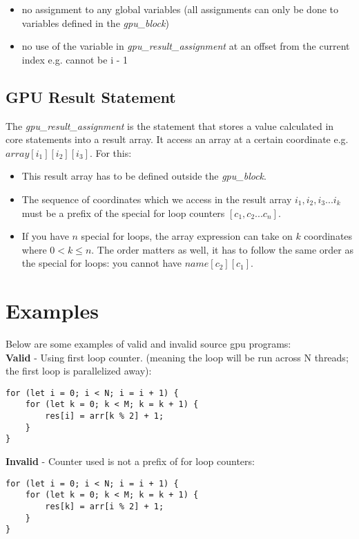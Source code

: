 \begin{itemize}
    \item{no assignment to any global variables (all assignments can only be done to variables defined in the \textit{gpu\_block}})
    \item{no use of the variable in \textit{gpu\_result\_assignment} at an offset from the current index e.g. cannot be i - 1}
\end{itemize}

\subsection*{GPU Result Statement}

The \textit{gpu\_result\_assignment} is the statement that stores a value calculated in core statements into a result array. 
It access an array at a certain coordinate e.g. ${array[{i_1}][{i_2}][{i_3}]}$. For this:

\begin{itemize}
    \item{This result array has to be defined outside the \textit{gpu\_block}.}
    \item{The sequence of coordinates which we access in the result array ${{i_1}, {i_2}, {i_3} ... i_{k}}$ must be a 
        prefix of the special for loop counters ${[c_1,c_2 ... c_n]}$.}
    \item{ If you have ${n}$ special for loops, the array expression can take on ${k}$ coordinates where ${0 < k \leq n}$. 
    The order matters as well, it has to follow the same order as the special for loops: you cannot have ${name[c_2][c_1]}$.}
\end{itemize}

\section*{Examples}

Below are some examples of valid and invalid source gpu programs:\\

\textbf{Valid} - Using first loop counter. (meaning the loop will be run across N threads; the first loop is parallelized away):
\begin{verbatim}
for (let i = 0; i < N; i = i + 1) {
    for (let k = 0; k < M; k = k + 1) {
        res[i] = arr[k % 2] + 1;
    }
}
\end{verbatim}

\textbf{Invalid} - Counter used is not a prefix of for loop counters:
\begin{verbatim}
for (let i = 0; i < N; i = i + 1) {
    for (let k = 0; k < M; k = k + 1) {
        res[k] = arr[i % 2] + 1;
    }
}
\end{verbatim}

